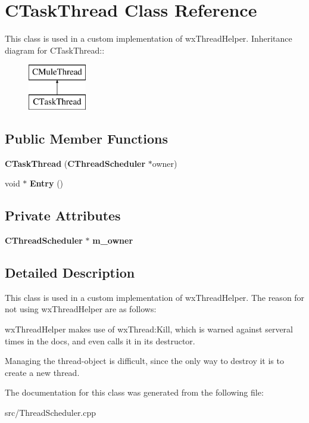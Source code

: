 \section{CTaskThread Class Reference}
\label{classCTaskThread}


This class is used in a custom implementation of wxThreadHelper.  
Inheritance diagram for CTaskThread::\begin{figure}[H]
\begin{center}
\leavevmode
\includegraphics[height=2cm]{classCTaskThread}
\end{center}
\end{figure}
\subsection*{Public Member Functions}
\begin{DoxyCompactItemize}
\item 
{\bfseries CTaskThread} ({\bf CThreadScheduler} $\ast$owner)\label{classCTaskThread_a9fcd75af9bf161bc19cfc7c96b737760}

\item 
void $\ast$ {\bf Entry} ()\label{classCTaskThread_a4248070b00b4f70489e37aa3468f9305}

\end{DoxyCompactItemize}
\subsection*{Private Attributes}
\begin{DoxyCompactItemize}
\item 
{\bf CThreadScheduler} $\ast$ {\bf m\_\-owner}\label{classCTaskThread_ac49ade8d87d1543a6276254faf902f7f}

\end{DoxyCompactItemize}


\subsection{Detailed Description}
This class is used in a custom implementation of wxThreadHelper. The reason for not using wxThreadHelper are as follows:
\begin{DoxyItemize}
\item wxThreadHelper makes use of wxThread:Kill, which is warned against serveral times in the docs, and even calls it in its destructor.
\item Managing the thread-\/object is difficult, since the only way to destroy it is to create a new thread. 
\end{DoxyItemize}

The documentation for this class was generated from the following file:\begin{DoxyCompactItemize}
\item 
src/ThreadScheduler.cpp\end{DoxyCompactItemize}
